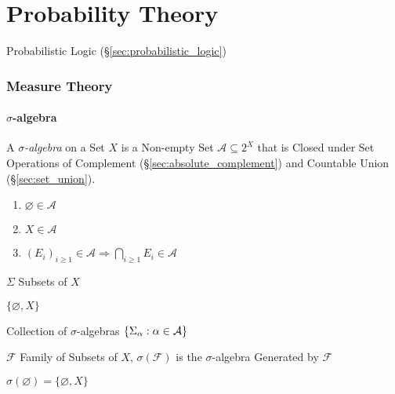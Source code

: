 \part{Probability Theory}\label{part:probability_theory}

\fist Probabilistic Logic (\S\ref{sec:probabilistic_logic})



\section{Measure Theory}\label{sec:measure_theory}

\subsection{$\sigma$-algebra}\label{sec:sigma_algebra}

A \emph{$\sigma$-algebra} on a Set $X$ is a Non-empty Set $\mathcal{A}
\subseteq 2^X$ that is Closed under Set Operations of Complement
(\S\ref{sec:absolute_complement}) and Countable Union (\S\ref{sec:set_union}).

\begin{enumerate}
  \item $\varnothing \in \mathcal{A}$
  \item $X \in \mathcal{A}$
  \item $(E_i)_{i \geq 1} \in \mathcal{A} \Rightarrow
    \bigcap_{i \geq 1} E_i \in \mathcal{A}$
\end{enumerate}

$\Sigma$ Subsets of $X$

$\{ \varnothing, X \}$

Collection of $\sigma$-algebras $\{ \Sigma_\alpha : \alpha \in \mathcal{A} \}$

$\mathcal{F}$ Family of Subsets of $X$, $\sigma(\mathcal{F})$ is the
$\sigma$-algebra Generated by $\mathcal{F}$

$\sigma(\varnothing) = \{ \varnothing, X \}$

